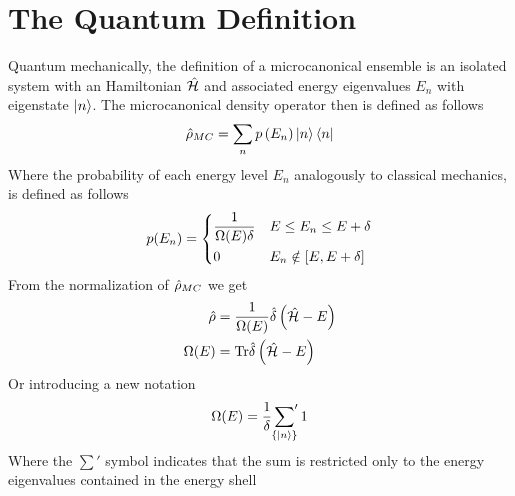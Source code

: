 \documentclass[../qm.tex]{subfiles}
\begin{document}
		\section{The Quantum Definition}
		Quantum mechanically, the definition of a microcanonical ensemble is an isolated system with an Hamiltonian $\hat{\mathcal{H}}$ and associated energy eigenvalues $E_n$ with eigenstate $\ket{n}$. The microcanonical density operator then is defined as follows
		\begin{equation}
			\hat{\rho}_{MC}=\sum_np\left( E_n \right)\ket{n}\bra{n}
			\label{eq:mcdopr}
		\end{equation}
		Where the probability of each energy level $E_n$ analogously to classical mechanics, is defined as follows
		\begin{equation}
			p(E_n)=\begin{dcases}
				\frac{1}{\Omega(E)\delta}&E\le E_n\le E+\delta\\
				0&E_n\notin[E,E+\delta]
			\end{dcases}
			\label{eq:probabilitystatedoprmc}
		\end{equation}
		From the normalization of $\hat{\rho}_{MC}$ we get
		\begin{equation}
			\begin{aligned}
				\hat{\rho}&=\frac{1}{\Omega(E)}\hat{\delta}\left( \hat{\mathcal{H}}-E \right)\\
				\Omega(E)&=\mathrm{Tr}{\hat{\delta}}\left( \hat{\mathcal{H}}-E \right)
			\end{aligned}
			\label{eq:OmegaEquantummc}
		\end{equation}
		Or introducing a new notation
		\begin{equation}
			\Omega(E)=\frac{1}{\delta}\sideset{}{'}\sum_{\{\ket{n}\}}1
			\label{eq:sumone}
		\end{equation}
		Where the $\sum'$ symbol indicates that the sum is restricted only to the energy eigenvalues contained in the energy shell
\end{document}
